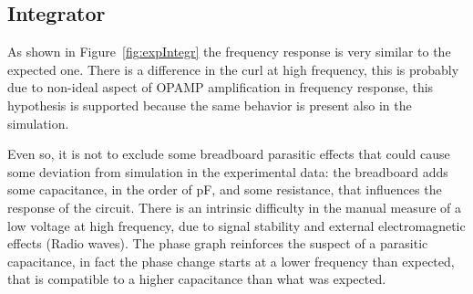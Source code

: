 \documentclass[a4paper, twocolumn]{article}
\begin{document}
\subsection{Integrator}

As shown in Figure~\ref{fig:expIntegr} the frequency response is very similar to the expected one. There is a difference in the curl at high frequency, this is probably due to non-ideal aspect of OPAMP amplification in frequency response, this hypothesis is supported because the same behavior is present also in the simulation.

Even so, it is not to exclude some breadboard parasitic effects that could  cause some deviation from simulation in the experimental data: the breadboard adds some capacitance, in the order of \unit{\pico\farad}, and some resistance, that influences the response of the circuit. There is an intrinsic difficulty in the manual measure of a low voltage at high frequency, due to signal stability and external electromagnetic effects (Radio waves). The phase graph reinforces the suspect of a parasitic capacitance, in fact the phase change starts at a lower frequency than expected, that is compatible to a higher capacitance than what was expected.
\end{document}
